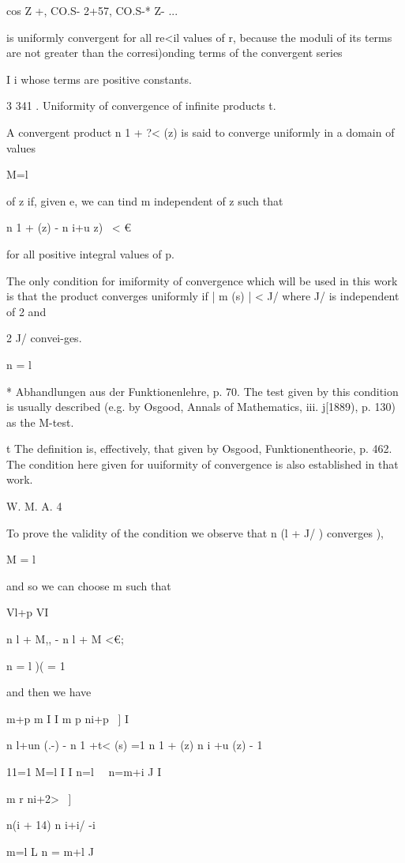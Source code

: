 cos Z +, CO.S- 2+57, CO.S-* Z- ...

is uniformly convergent for all re<il values of r, because the moduli
of its terms are not greater than the corresi)onding terms of the
convergent series

I i whose terms are positive constants.

3 341 . Uniformity of convergence of infinite products t.

A convergent product n 1 + ?< (z) is said to converge uniformly in a
domain of values

M=l

of z if, given e, we can tind m independent of z such that

n 1 + (z) - n i+u z) \ < €

for all positive integral values of p.

The only condition for imiformity of convergence which will be used in
this work is that the product converges uniformly if | m (s) | < J/
where J/ is independent of 2 and

2 J/ convei-ges.

n = l

* Abhandlungen aus der Funktionenlehre, p. 70. The test given by this
condition is usually described (e.g. by Osgood, Annals of Mathematics,
iii. j[1889), p. 130) as the M-test.

t The definition is, effectively, that given by Osgood,
Funktionentheorie, p. 462. The condition here given for uuiformity of
convergence is also established in that work.

W. M. A. 4

%
%

To prove the validity of the condition we observe that n (l + J/ )
converges ),

M = l

and so we can choose m such that

Vl+p VI

n l + M,, - n l + M <€;

n = l )( = 1

and then we have

m+p m I I m p ni+p ~] I

n l+un (.-) - n 1 +t< (s) =1 n 1 + (z) n i +u (z) - 1

11=1 M=l I I n=l \ \ n=m+i J I

m r ni+2> ~]

 n(i + 14) n i+i/ -i

m=l L n = m+l J

